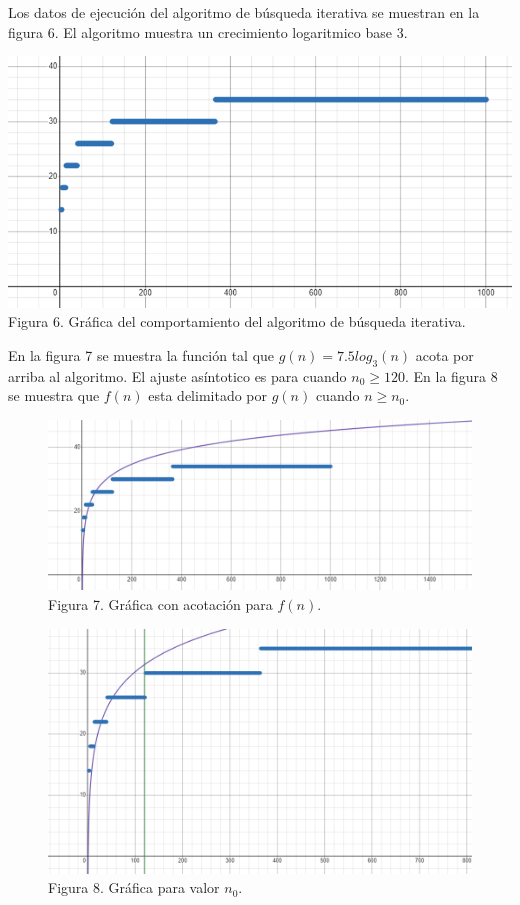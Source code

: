 \documentclass[12pt,twoside]{article}
\begin{document}
Los datos de ejecución del algoritmo de búsqueda iterativa se muestran en la figura 6. El algoritmo muestra un
crecimiento logaritmico base 3.

\medskip

\begin{minipage}{\linewidth}
  \centering
  \includegraphics[width=0.7\linewidth]{images/busquedaiterativaworscase.png}
  \\
  Figura 6. Gráfica del comportamiento del algoritmo de búsqueda iterativa.
\end{minipage}
\newpage

En la figura 7 se muestra la función tal que $g(n)=7.5log_3(n)$ acota por arriba al algoritmo. El ajuste asíntotico es para cuando $n_0\geq 120$. En la figura 8 se muestra que $f(n)$ esta delimitado por $g(n)$ cuando $n\geq n_0$.
\medskip
\begin{figure}[h]
  \begin{center}
    \includegraphics[width=0.7\linewidth]{images/busquedaiterativaworscasegn.png}
    \\
    Figura 7. Gráfica con acotación para $f(n)$.
  \end{center}
\end{figure}
\begin{figure}[h]
  \begin{center}
    \includegraphics[width=0.7\linewidth]{images/busquedaiterativaworscasegnacotado.png}
    \\
    Figura 8. Gráfica para valor $n_0$.
  \end{center}
\end{figure}
\end{document}
